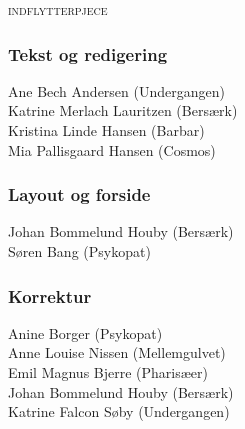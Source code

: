 \documentclass[11pt,article,twoside,openany,danish,extrafontsizes]{memoir} %
\begin{document}
\begin{titlingpage}
\begin{adjustwidth}{-1.5cm}{-2cm}
\begin{center}
\begin{vplace}[0.75]
%
%
%
%
%



\vfill


{\huge \scshape indflytterpjece}

\end{vplace}
\end{center}
\end{adjustwidth}

\clearpage

\strut\vfill

\begin{small}
\subsubsection{Tekst og redigering}
Ane Bech Andersen (Undergangen)\\
Katrine Merlach Lauritzen (Bersærk)\\
Kristina Linde Hansen (Barbar)\\
Mia Pallisgaard Hansen (Cosmos)

\subsubsection{Layout og forside}
Johan Bommelund Houby (Bersærk)\\
Søren Bang (Psykopat)

\subsubsection{Korrektur}
Anine Borger (Psykopat)\\
Anne Louise Nissen (Mellemgulvet)\\
Emil Magnus Bjerre (Pharisæer)\\
Johan Bommelund Houby (Bersærk)\\
Katrine Falcon Søby (Undergangen)
\end{small}
\end{titlingpage}
\end{document}
